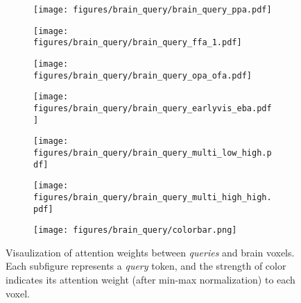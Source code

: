 \begin{figure*}[t]
    \begin{subfigure}[c]{0.15\textwidth}
        \centering
        \texttt{[image: figures/brain\_query/brain\_query\_ppa.pdf]}
        \vspace{-1.5em}
        \caption{}
        \label{sub:ppa}
    \end{subfigure}
    \hfill
    \begin{subfigure}[c]{0.15\textwidth}
        \centering
        \texttt{[image: figures/brain\_query/brain\_query\_ffa\_1.pdf]}
        \vspace{-1.5em}
                \caption{}
        \label{sub:ffa-1}
    \end{subfigure}
    \hfill
    \begin{subfigure}[c]{0.15\textwidth}
        \centering
        \texttt{[image: figures/brain\_query/brain\_query\_opa\_ofa.pdf]}
        \vspace{-1.5em}
        \caption{}
        \label{sub:opa_ofa}
    \end{subfigure}
    \hfill
    \begin{subfigure}[c]{0.15\textwidth}
        \centering
        \texttt{[image: figures/brain\_query/brain\_query\_earlyvis\_eba.pdf]}
        \vspace{-1.5em}
        \caption{}
        \label{sub:ev_eba}
    \end{subfigure}
    \hfill
    \begin{subfigure}[c]{0.15\textwidth}
        \centering
        \texttt{[image: figures/brain\_query/brain\_query\_multi\_low\_high.pdf]}
        \vspace{-1.5em}
        \caption{}
        \label{sub:low_high}
    \end{subfigure}
    \hfill
    \begin{subfigure}[c]{0.15\textwidth}
        \centering
        \texttt{[image: figures/brain\_query/brain\_query\_multi\_high\_high.pdf]}
        \vspace{-1.5em}
        \caption{}
        \label{sub:high_high}
    \end{subfigure}
    \hfill
    \begin{subfigure}[c]{0.05\textwidth}
        \centering
        \texttt{[image: figures/brain\_query/colorbar.png]}
    \end{subfigure}
    \vspace{-1.4em}
    \caption{Visaulization of attention weights between \textit{queries} and brain voxels. Each subfigure represents a \textit{query} token, and the strength of color indicates its attention weight (after min-max normalization) to each voxel. 
    }
    \label{fig:query}
    \vspace{-1.2em}
\end{figure*}

